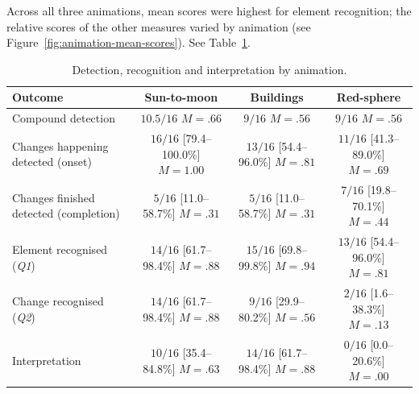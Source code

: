 \documentclass[
english,                 %
bibtex,                  %
includeExtraAbstracts, %
]{kththesis}
\newenvironment{evidenceblock}{\par\addvspace{6pt}\noindent\begin{minipage}{\linewidth}}{\end{minipage}\par\addvspace{6pt}}
\numberwithin{listing}{chapter}
\begin{document}
\begin{evidenceblock}
\normalsize
Across all three animations, mean scores were highest for element recognition; the relative scores of the other measures varied by animation (see Figure~\ref{fig:animation-mean-scores}). See Table~\ref{tab:animation-outcomes}.

\begin{table}[htb]
\centering
\scriptsize
\caption{Detection, recognition and interpretation by animation.}
\label{tab:animation-outcomes}
\setlength{\tabcolsep}{3pt}
\renewcommand{\arraystretch}{1.1}
\begin{tabularx}{\textwidth}{@{}>{\raggedright\arraybackslash}X c c c@{}}
\toprule
Outcome & Sun-to-moon & Buildings & Red-sphere \\
\midrule
Compound detection & \shortstack{$10.5/16$\\$M = .66$} & \shortstack{$9/16$\\$M = .56$} & \shortstack{$9/16$\\$M = .56$} \\[3pt]
\hspace{0.5em}Changes happening detected (onset) & \shortstack{$16/16$ [79.4--100.0\%]\\$M = 1.00$} & \shortstack{$13/16$ [54.4--96.0\%]\\$M = .81$} & \shortstack{$11/16$ [41.3--89.0\%]\\$M = .69$} \\[3pt]
\hspace{0.5em}Changes finished detected (completion) & \shortstack{$5/16$ [11.0--58.7\%]\\$M = .31$} & \shortstack{$5/16$ [11.0--58.7\%]\\$M = .31$} & \shortstack{$7/16$ [19.8--70.1\%]\\$M = .44$} \\[3pt]
Element recognised (\textit{Q1}) & \shortstack{$14/16$ [61.7--98.4\%]\\$M = .88$} & \shortstack{$15/16$ [69.8--99.8\%]\\$M = .94$} & \shortstack{$13/16$ [54.4--96.0\%]\\$M = .81$} \\[3pt]
Change recognised (\textit{Q2}) & \shortstack{$14/16$ [61.7--98.4\%]\\$M = .88$} & \shortstack{$9/16$ [29.9--80.2\%]\\$M = .56$} & \shortstack{$2/16$ [1.6--38.3\%]\\$M = .13$} \\[3pt]
Interpretation & \shortstack{$10/16$ [35.4--84.8\%]\\$M = .63$} & \shortstack{$14/16$ [61.7--98.4\%]\\$M = .88$} & \shortstack{$0/16$ [0.0--20.6\%]\\$M = .00$} \\[3pt]

\end{tabularx}
\end{table}
\end{evidenceblock}
\end{document}
